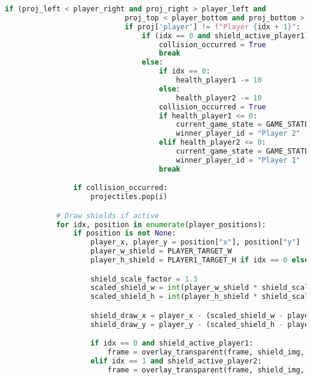 \documentclass[11pt,a4paper]{article}
\begin{document}
\begin{lstlisting}[language=Python, caption=fungsi main]
                        if (proj_left < player_right and proj_right > player_left and
                            proj_top < player_bottom and proj_bottom > player_top):
                            if proj['player'] != f"Player {idx + 1}":
                                if (idx == 0 and shield_active_player1) or (idx == 1 and shield_active_player2):
                                    collision_occurred = True
                                    break
                                else:
                                    if idx == 0:
                                        health_player1 -= 10
                                    else:
                                        health_player2 -= 10
                                    collision_occurred = True
                                    if health_player1 <= 0:
                                        current_game_state = GAME_STATE_WINNER
                                        winner_player_id = "Player 2"
                                    elif health_player2 <= 0:
                                        current_game_state = GAME_STATE_WINNER
                                        winner_player_id = "Player 1"
                                    break

                if collision_occurred:
                    projectiles.pop(i)

            # Draw shields if active
            for idx, position in enumerate(player_positions):
                if position is not None:
                    player_x, player_y = position["x"], position["y"]
                    player_w_shield = PLAYER_TARGET_W
                    player_h_shield = PLAYER1_TARGET_H if idx == 0 else PLAYER2_TARGET_H

                    shield_scale_factor = 1.3
                    scaled_shield_w = int(player_w_shield * shield_scale_factor)
                    scaled_shield_h = int(player_h_shield * shield_scale_factor)

                    shield_draw_x = player_x - (scaled_shield_w - player_w_shield) // 2
                    shield_draw_y = player_y - (scaled_shield_h - player_h_shield) // 2

                    if idx == 0 and shield_active_player1:
                        frame = overlay_transparent(frame, shield_img, shield_draw_x, shield_draw_y, (scaled_shield_w, scaled_shield_h))
                    elif idx == 1 and shield_active_player2:
                        frame = overlay_transparent(frame, shield_img, shield_draw_x, shield_draw_y, (scaled_shield_w, scaled_shield_h))


\end{lstlisting}
\end{document}
